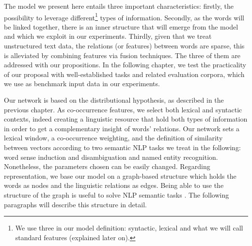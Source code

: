 The model we present here entails three  important characteristics: firstly, the possibility to leverage different\footnote{We use three in our model definition: syntactic, lexical  and what we will call standard features (explained later on).} types of information.  Secondly, as the words will be linked together, there is an inner structure that will emerge from the model and which we exploit in our experiments. Thirdly, given that we treat unstructured text data, the relations (or features)  between words are sparse, this is alleviated by combining features via fusion techniques.  The three of them are addressed with our propositions. 
In the following chapter, we test the practicality of our proposal with well-established tasks and related evaluation corpora, which we use as benchmark input data in our experiments. 

Our network is based on the distributional hypothesis, as described in the previous chapter.  As co-occurrence features, we select both lexical and syntactic contexts, indeed creating a linguistic resource that hold both types of information in order to get a complementary insight of words' relations. Our network sets a lexical window, a co-occurrence weighting, and the definition of similarity between vectors according to two semantic NLP tasks 
we treat in the following: word sense induction and disambiguation and named entity recognition. Nonetheless, the parameters chosen can be easily changed. Regarding representation, we base our model on a graph-based structure which holds the words as nodes and the linguistic relations as edges. Being able to use the structure of the graph is useful to solve NLP semantic tasks \cite{nastase2015}. The following paragraphs will describe this structure in detail.   
%





